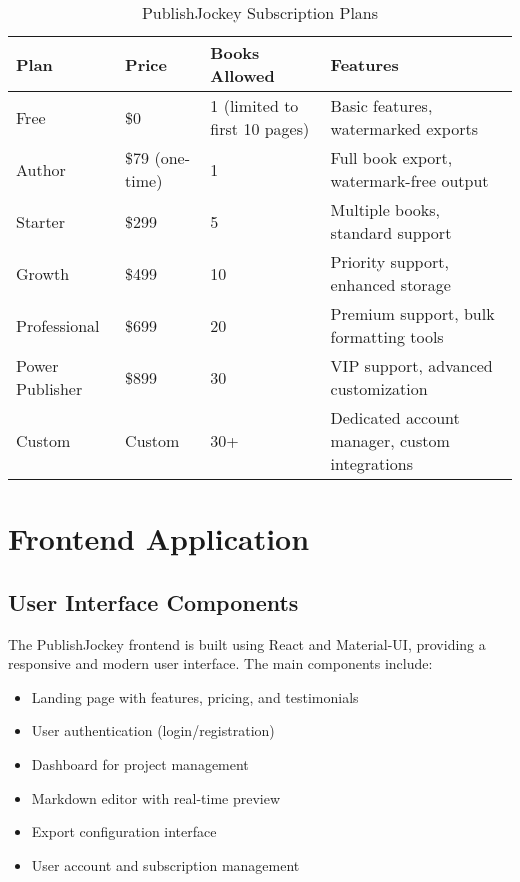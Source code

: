 \documentclass[12pt,a4paper]{book}
\begin{document}
\begin{table}[h]
\centering
\begin{tabularx}{\textwidth}{|X|X|X|X|}
\hline
\textbf{Plan} & \textbf{Price} & \textbf{Books Allowed} & \textbf{Features} \\
\hline
Free & \$0 & 1 (limited to first 10 pages) & Basic features, watermarked exports \\
\hline
Author & \$79 (one-time) & 1 & Full book export, watermark-free output \\
\hline
Starter & \$299 & 5 & Multiple books, standard support \\
\hline
Growth & \$499 & 10 & Priority support, enhanced storage \\
\hline
Professional & \$699 & 20 & Premium support, bulk formatting tools \\
\hline
Power Publisher & \$899 & 30 & VIP support, advanced customization \\
\hline
Custom & Custom & 30+ & Dedicated account manager, custom integrations \\
\hline
\end{tabularx}
\caption{PublishJockey Subscription Plans}
\end{table}

\chapter{Frontend Application}

\section{User Interface Components}

The PublishJockey frontend is built using React and Material-UI, providing a responsive and modern user interface. The main components include:

\begin{itemize}
  \item Landing page with features, pricing, and testimonials
  \item User authentication (login/registration)
  \item Dashboard for project management
  \item Markdown editor with real-time preview
  \item Export configuration interface
  \item User account and subscription management
\end{itemize}
\end{document}
